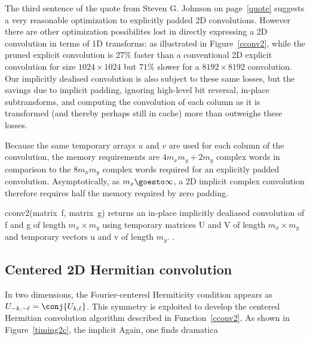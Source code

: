 \documentclass[final]{siamltex}
\begin{document}
The third sentence of the quote from Steven G. Johnson
on page~\ref{quote} suggests a very reasonable optimization
to explicitly padded 2D convolutions.
However there are other optimization possibilites lost in directly
expressing a 2D convolution in terms of 1D transforms: as illustrated in
Figure~\ref{cconv2}, while the pruned explicit convolution is 27\% faster
than a conventional 2D explicit convolution for size $1024\times 1024$ but
$71\%$ slower for a $8192\times 8192$ convolution. Our implicitly dealised
convolution is also subject to these same losses, but the savings due to
implicit padding, ignoring high-level bit reversal, in-place subtransforms, 
and computing the convolution of each column as it is transformed (and
thereby perhaps still in cache) more than outweighs these losses.

Because the same temporary arrays $u$ and $v$ are used for each column
of the convolution, the memory requirements are $4m_xm_y+2m_y$ complex
words in comparison to the $8m_xm_y$ complex words required for an
explicitly padded convolution. Asymptotically, as $m_x\goesto\infty$,
a 2D implicit complex convolution therefore requires half the memory
required by zero padding.


\begin{function}[htbp]
  \Return \xf\;
\caption{cconv2(matrix~{\sf f}, matrix~{\sf g}) 
returns an in-place implicitly dealiased convolution of
{\sf f} and {\sf g} of length $m_x\times m_y$ using temporary matrices 
{\sf U} and {\sf V} of length $m_x\times m_y$ and temporary vectors
{\sf u} and {\sf v} of length $m_y$.
.}\label{cconv2}
\end{function}

\subsection{Centered 2D Hermitian convolution}

In two dimensions, the Fourier-centered Hermiticity condition appears as
$U_{-k,-\ell}=\conj{U_{k,\ell}}$. 
This symmetry is exploited to develop the centered Hermitian convolution
algorithm described in Function~\ref{cconv2}. As shown in
Figure~\ref{timing2c}, the implicit 
Again, one finds dramatica
\end{document}
